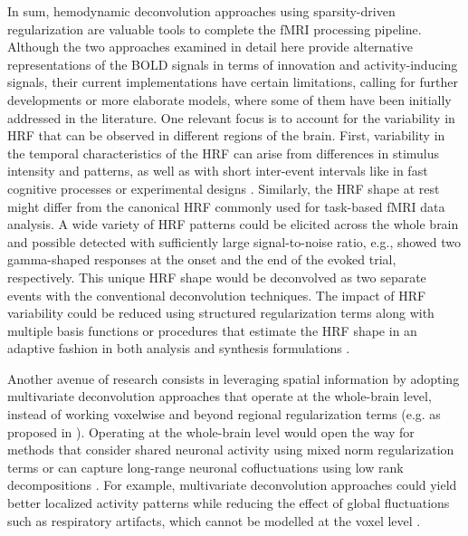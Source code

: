 In sum, hemodynamic deconvolution approaches using sparsity-driven
regularization are valuable tools to complete the fMRI processing pipeline.
Although the two approaches examined in detail here provide alternative
representations of the BOLD signals in terms of innovation and activity-inducing
signals, their current implementations have certain limitations, calling for
further developments or more elaborate models, where some of them have been
initially addressed in the literature. One relevant focus is to account for the
variability in HRF that can be observed in different regions of the brain.
First, variability in the temporal characteristics of the HRF
can arise from differences in stimulus intensity and patterns, as well as with
short inter-event intervals like in fast cognitive processes or experimental
designs
\citep{Yesilyurt2008DynamicsnonlinearitiesBOLD,Chen2021Investigatingmechanismsfast,
Sadaghiani2009Neuralactivityinduced,Polimeni2021Imagingfasterneural}.
Similarly, the HRF shape at rest might differ from the canonical HRF commonly
used for task-based fMRI data analysis. A wide variety of HRF patterns could be
elicited across the whole brain and possible detected with sufficiently large
signal-to-noise ratio, e.g., \citep{GonzalezCastillo2012Wholebraintime} showed
two gamma-shaped responses at the onset and the end of the evoked trial,
respectively. This unique HRF shape would be deconvolved as two separate events
with the conventional deconvolution techniques. The impact of HRF variability
could be reduced using structured regularization terms along with multiple basis
functions \citep{Gaudes2012Structuredsparsedeconvolution} or procedures that
estimate the HRF shape in an adaptive fashion in both analysis
\citep{Farouj2019BoldSignalDeconvolution} and synthesis formulations
\citep{cherkaoui:hal-03005584}.

Another avenue of research consists in leveraging spatial information by
adopting multivariate deconvolution approaches that operate at the whole-brain
level, instead of working voxelwise and beyond regional regularization terms
(e.g. as proposed in \citealt{Karahanoglu2013TotalactivationfMRI}). Operating
at the whole-brain level would open the way for methods that consider shared
neuronal activity using mixed norm regularization terms
\citep{urunuela-tremino_2019} or can capture long-range neuronal cofluctuations
using low rank decompositions \citep{cherkaoui:hal-03005584}. For example,
multivariate deconvolution approaches could yield better localized activity
patterns while reducing the effect of global fluctuations such as respiratory
artifacts, which cannot be modelled at the voxel level \citep{Urunuela_2021}.

